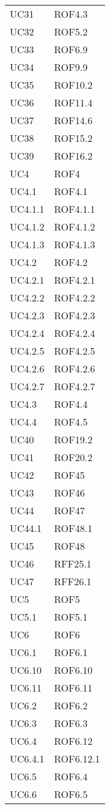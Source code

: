 \begin{longtable}{p{2.5cm}!{\VRule[1pt]}p{2.5cm}}
	UC31 & ROF4.3\\
	UC32 & ROF5.2\\
	UC33 & ROF6.9\\
	UC34 & ROF9.9\\
	UC35 & ROF10.2\\
	UC36 & ROF11.4\\
	UC37 & ROF14.6\\
	UC38 & ROF15.2\\
	UC39 & ROF16.2\\
	UC4 & ROF4\\
	UC4.1 & ROF4.1\\
	UC4.1.1 & ROF4.1.1\\
	UC4.1.2 & ROF4.1.2\\
	UC4.1.3 & ROF4.1.3\\
	UC4.2 & ROF4.2\\
	UC4.2.1 & ROF4.2.1\\
	UC4.2.2 & ROF4.2.2\\
	UC4.2.3 & ROF4.2.3\\
	UC4.2.4 & ROF4.2.4\\
	UC4.2.5 & ROF4.2.5\\
	UC4.2.6 & ROF4.2.6\\
	UC4.2.7 & ROF4.2.7\\
	UC4.3 & ROF4.4\\
	UC4.4 & ROF4.5\\
	UC40 & ROF19.2\\
	UC41 & ROF20.2\\
	UC42 & ROF45\\
	UC43 & ROF46\\
	UC44 & ROF47\\
	UC44.1 & ROF48.1\\
	UC45 & ROF48\\
	UC46 & RFF25.1\\
	UC47 & RFF26.1\\
	UC5 & ROF5\\
	UC5.1 & ROF5.1\\
	UC6 & ROF6\\
	UC6.1 & ROF6.1\\
	UC6.10 & ROF6.10\\
	UC6.11 & ROF6.11\\
	UC6.2 & ROF6.2\\
	UC6.3 & ROF6.3\\
	UC6.4 & ROF6.12\\
	UC6.4.1 & ROF6.12.1\\
	UC6.5 & ROF6.4\\
	UC6.6 & ROF6.5\\

\end{longtable}
